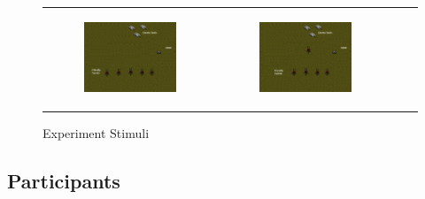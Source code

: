 \documentclass[11pt,letterpaper]{article}
\begin{document}
\begin{figure}
{\begin{tabular}{cccc}
\begin{subfigure}[b]{0.18\textwidth}\includegraphics[width=\textwidth]{figures/turrets.jpeg}\caption{}\label{fig:turrets-a}\end{subfigure}&
\begin{subfigure}[b]{0.18\textwidth}\includegraphics[width=\textwidth]{figures/turrets-plus-one.jpeg}\caption{}\label{fig:turrets-b}\end{subfigure}
\end{tabular}
}
\caption{Experiment Stimuli}
\label{fig:exp_stimuli}
\end{figure}


\subsection{Participants}
\end{document}
